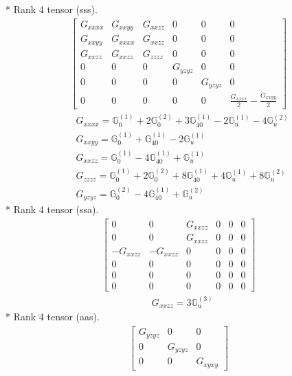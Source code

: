 \documentclass[fleqn,8pt,landscape]{jsarticle}
\begin{document}
* Rank 4 tensor (sss).
\begin{align*}
\begin{bmatrix} G_{xxxx} & G_{xxyy} & G_{xxzz} & 0 & 0 & 0 \\ G_{xxyy} & G_{xxxx} & G_{xxzz} & 0 & 0 & 0 \\ G_{xxzz} & G_{xxzz} & G_{zzzz} & 0 & 0 & 0 \\ 0 & 0 & 0 & G_{yzyz} & 0 & 0 \\ 0 & 0 & 0 & 0 & G_{yzyz} & 0 \\ 0 & 0 & 0 & 0 & 0 & \frac{G_{xxxx}}{2} - \frac{G_{xxyy}}{2} \end{bmatrix}
\end{align*}
\begin{align*}
& G_{xxxx} = \mathbb{G}_{0}^{(1)} + 2 \mathbb{G}_{0}^{(2)} + 3 \mathbb{G}_{40}^{(1)} - 2 \mathbb{G}_{u}^{(1)} - 4 \mathbb{G}_{u}^{(2)} \\
& G_{xxyy} = \mathbb{G}_{0}^{(1)} + \mathbb{G}_{40}^{(1)} - 2 \mathbb{G}_{u}^{(1)} \\
& G_{xxzz} = \mathbb{G}_{0}^{(1)} - 4 \mathbb{G}_{40}^{(1)} + \mathbb{G}_{u}^{(1)} \\
& G_{zzzz} = \mathbb{G}_{0}^{(1)} + 2 \mathbb{G}_{0}^{(2)} + 8 \mathbb{G}_{40}^{(1)} + 4 \mathbb{G}_{u}^{(1)} + 8 \mathbb{G}_{u}^{(2)} \\
& G_{yzyz} = \mathbb{G}_{0}^{(2)} - 4 \mathbb{G}_{40}^{(1)} + \mathbb{G}_{u}^{(2)}
\end{align*}
* Rank 4 tensor (ssa).
\begin{align*}
\begin{bmatrix} 0 & 0 & G_{xxzz} & 0 & 0 & 0 \\ 0 & 0 & G_{xxzz} & 0 & 0 & 0 \\ - G_{xxzz} & - G_{xxzz} & 0 & 0 & 0 & 0 \\ 0 & 0 & 0 & 0 & 0 & 0 \\ 0 & 0 & 0 & 0 & 0 & 0 \\ 0 & 0 & 0 & 0 & 0 & 0 \end{bmatrix}
\end{align*}
\begin{align*}
& G_{xxzz} = 3 \mathbb{G}_{u}^{(3)}
\end{align*}
* Rank 4 tensor (aas).
\begin{align*}
\begin{bmatrix} G_{yzyz} & 0 & 0 \\ 0 & G_{yzyz} & 0 \\ 0 & 0 & G_{xyxy} \end{bmatrix}
\end{align*}
\end{document}
